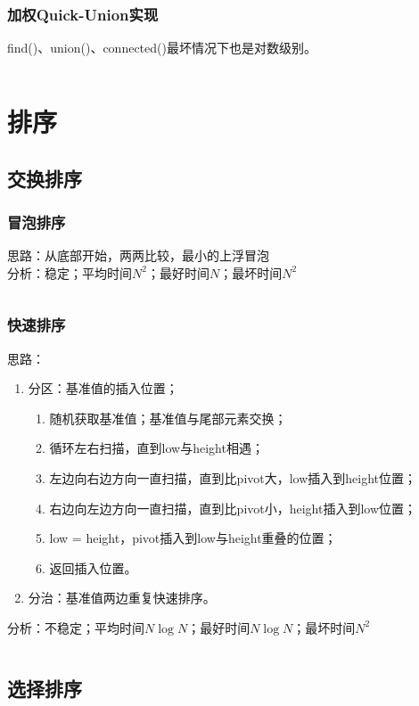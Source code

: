 \documentclass{article}
\begin{document}
  \subsubsection{加权Quick-Union实现}
  find()、union()、connected()最坏情况下也是对数级别。
  \inputminted{java}{src/chapter01/WeightedQuickUnion.java}

  \section{排序}
  \subsection{交换排序}
    \subsubsection{冒泡排序}
    思路：从底部开始，两两比较，最小的上浮冒泡
    \\[10pt] 分析：稳定；平均时间$N^2$；最好时间$N$；最坏时间$N^2$
    \inputminted{java}{src/chapter02/BubbleSort.java}

    \subsubsection{快速排序}
    思路：
    \begin{enumerate}
      \item 分区：基准值的插入位置；
      \begin{enumerate}
        \item 随机获取基准值；基准值与尾部元素交换；
        \item 循环左右扫描，直到low与height相遇；
        \item 左边向右边方向一直扫描，直到比pivot大，low插入到height位置；
        \item 右边向左边方向一直扫描，直到比pivot小，height插入到low位置；
        \item low = height，pivot插入到low与height重叠的位置；
        \item 返回插入位置。
      \end{enumerate}
      \item 分治：基准值两边重复快速排序。
    \end{enumerate}
    分析：不稳定；平均时间$N \log N$；最好时间$N \log N$；最坏时间$N^2$

    \inputminted{java}{src/chapter02/QuickSort.java}

  \subsection{选择排序}
\end{document}
